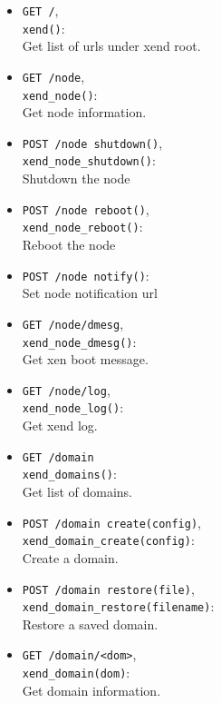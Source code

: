 \documentclass[11pt,twoside,final,openright]{xenstyle}
\begin{document}
\begin{itemize}
\item {\tt GET /},\\
  {\tt xend()}:\\
  Get list of urls under xend root.

\item {\tt GET /node},\\
  {\tt xend\_node()}:\\
  Get node information.

\item {\tt POST /node shutdown()},\\
  {\tt xend\_node\_shutdown()}:\\
  Shutdown the node

\item {\tt POST /node reboot()},\\
  {\tt xend\_node\_reboot()}:\\
  Reboot the node

\item {\tt POST /node notify()}:\\
  Set node notification url
  
\item {\tt GET /node/dmesg},\\
  {\tt xend\_node\_dmesg()}:\\
  Get xen boot message.

\item {\tt GET /node/log},\\
  {\tt xend\_node\_log()}:\\
  Get xend log.

\item {\tt GET /domain}\\
  {\tt xend\_domains()}:\\
  Get list of domains.

\item {\tt POST /domain create(config)},\\
  {\tt xend\_domain\_create(config)}:\\
  Create a domain.

\item {\tt POST /domain restore(file)},\\
  {\tt xend\_domain\_restore(filename)}:\\
  Restore a saved domain.

\item {\tt GET /domain/<dom>},\\
  {\tt xend\_domain(dom)}:\\
  Get domain information.


\end{itemize}
\end{document}
